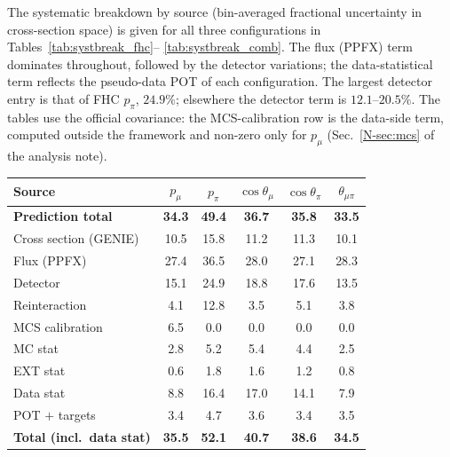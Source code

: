 \documentclass[11pt,a4paper]{article}
\newcommand{\noteref}[2]{#1~\ref{N-#2} of the analysis note}
\begin{document}
The systematic breakdown by source (bin-averaged fractional uncertainty in cross-section
space) is given for all three configurations in Tables~\ref{tab:systbreak_fhc}--%
\ref{tab:systbreak_comb}. The flux (PPFX) term dominates throughout, followed by the
detector variations; the data-statistical term reflects the pseudo-data POT of each
configuration. The largest detector entry is that of FHC $p_\pi$, $24.9\%$; elsewhere the detector
term is $12.1$--$20.5\%$. The tables use the official covariance: the MCS-calibration row is the
data-side term, computed outside the framework and non-zero only for $p_\mu$ (\noteref{Sec.}{sec:mcs}).

\begin{center}\scriptsize
{}
\label{tab:systbreak_fhc}
\begin{tabular}{lccccc}
\toprule
Source & $p_\mu$ & $p_\pi$ & $\cos\theta_\mu$ & $\cos\theta_\pi$ & $\theta_{\mu\pi}$ \\
\midrule
\textbf{Prediction total} & \textbf{34.3} & \textbf{49.4} & \textbf{36.7} & \textbf{35.8} & \textbf{33.5} \\
Cross section (GENIE) & 10.5 & 15.8 & 11.2 & 11.3 & 10.1 \\
Flux (PPFX) & 27.4 & 36.5 & 28.0 & 27.1 & 28.3 \\
Detector & 15.1 & 24.9 & 18.8 & 17.6 & 13.5 \\
Reinteraction & 4.1 & 12.8 & 3.5 & 5.1 & 3.8 \\
MCS calibration & 6.5 & 0.0 & 0.0 & 0.0 & 0.0 \\
MC stat & 2.8 & 5.2 & 5.4 & 4.4 & 2.5 \\
EXT stat & 0.6 & 1.8 & 1.6 & 1.2 & 0.8 \\
Data stat & 8.8 & 16.4 & 17.0 & 14.1 & 7.9 \\
POT $+$ targets & 3.4 & 4.7 & 3.6 & 3.4 & 3.5 \\
\textbf{Total (incl.\ data stat)} & \textbf{35.5} & \textbf{52.1} & \textbf{40.7} & \textbf{38.6} & \textbf{34.5} \\
\bottomrule
\end{tabular}
\end{center}
\end{document}
